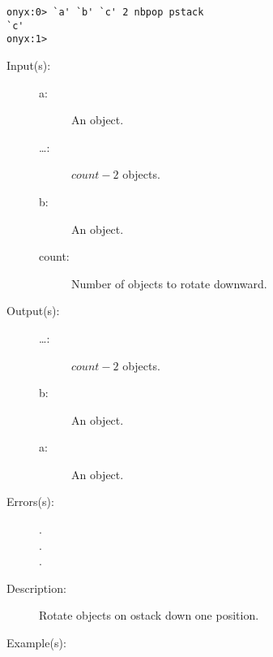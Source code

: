 \begin{description}
\begin{description}
\begin{verbatim}
onyx:0> `a' `b' `c' 2 nbpop pstack
`c'
onyx:1>
		\end{verbatim}
	\end{description}
\label{systemdict:ndn}
\item[{\onyxop{a \dots b count}{ndn}{\dots b a}}: ]
	\begin{description}\item[]
	\item[Input(s): ]
		\begin{description}\item[]
		\item[a: ]
			An object.
		\item[\dots: ]
			$count - 2$ objects.
		\item[b: ]
			An object.
		\item[count: ]
			Number of objects to rotate downward.
		\end{description}
	\item[Output(s): ]
		\begin{description}\item[]
		\item[\dots: ]
			$count - 2$ objects.
		\item[b: ]
			An object.
		\item[a: ]
			An object.
		\end{description}
	\item[Errors(s): ]
		\begin{description}\item[]
		\item[.]
		\item[.]
		\item[.]
		\end{description}
	\item[Description: ]
		Rotate  objects on ostack down one position.
	\item[Example(s): ]\begin{verbatim}


\end{verbatim}
\end{description}
\end{description}
